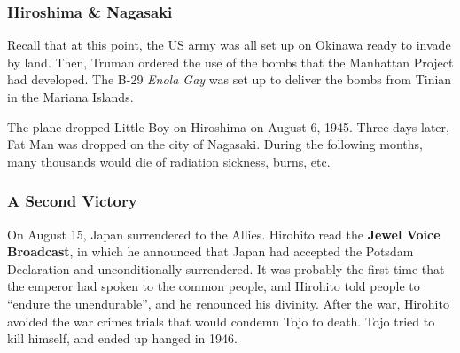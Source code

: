 \subsubsection*{Hiroshima \& Nagasaki}

Recall that at this point, the US army was all set up on Okinawa ready to invade by land.
Then, Truman ordered the use of the bombs that the Manhattan Project had developed.
The B-29 \textit{Enola Gay} was set up to deliver the bombs from Tinian in the Mariana Islands.

The plane dropped Little Boy on Hiroshima on August 6, 1945.
Three days later, Fat Man was dropped on the city of Nagasaki.
During the following months, many thousands would die of radiation sickness, burns, etc.

\subsubsection*{A Second Victory}

On August 15, Japan surrendered to the Allies.
Hirohito read the \textbf{Jewel Voice Broadcast},
in which he announced that Japan had accepted the Potsdam Declaration and unconditionally surrendered.
It was probably the first time that the emperor had spoken to the common people,
and Hirohito told people to ``endure the unendurable'', and he renounced his divinity.
After the war, Hirohito avoided the war crimes trials that would condemn Tojo to death.
Tojo tried to kill himself, and ended up hanged in 1946.


